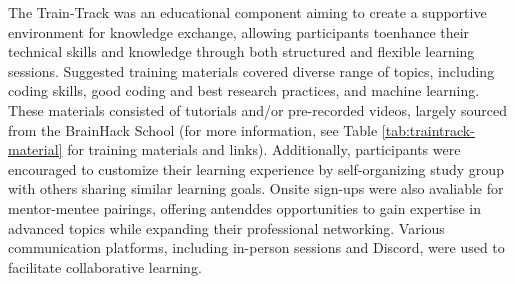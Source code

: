\documentclass{article}
\begin{document}
The Train-Track was an educational component aiming to create a supportive environment for knowledge exchange, allowing participants toenhance their technical skills and knowledge through both structured and flexible learning sessions. Suggested training materials covered diverse range of topics, including coding skills, good coding and best research practices, and machine learning. These materials consisted of tutorials and/or pre-recorded videos, largely sourced from the BrainHack School (for more information, see Table \ref{tab:traintrack-material} for training materials and links). Additionally, participants were encouraged to customize their learning experience  by self-organizing  study group with others sharing similar learning goals. Onsite sign-ups were also avaliable for mentor-mentee pairings, offering antenddes opportunities to gain expertise in advanced topics while expanding their professional networking. Various communication platforms, including in-person sessions and Discord, were used to facilitate collaborative learning.
\end{document}
